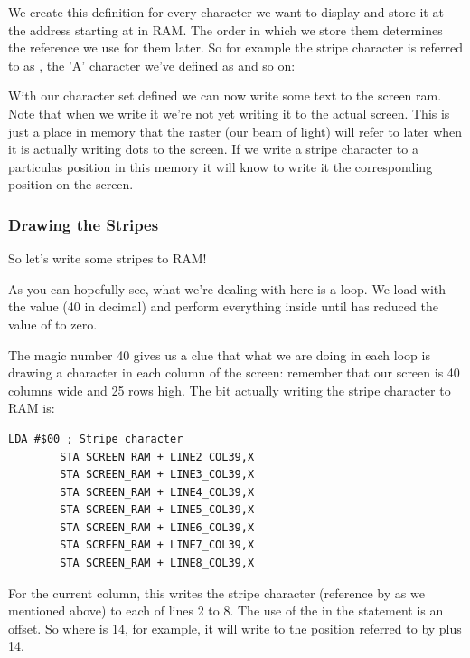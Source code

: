 We create this definition for every character we want to display and store it at the address starting at 
in RAM. The order in which we store them determines the reference we use for them later. So for example the stripe
character is referred to as , the 'A' character we've defined as  and so on:



With our character set defined we can now write some text to the screen ram. Note that when we write it 
we're not yet writing it to the actual screen. This is just a place in memory that the raster (our beam of light)
will refer to later when it is actually writing dots to the screen. If we write a stripe character to a particulas position
in this  memory it will know to write it the corresponding position on the screen.

\subsubsection{Drawing the Stripes}
So let's write some stripes to RAM!

%


As you can hopefully see, what we're dealing with here is a loop. We load  with the value  (40 in decimal)
and perform everything inside  until  has reduced the value of  to zero.

The magic number 40 gives us a clue that what we are doing in each loop is drawing a character in each column of the screen:
remember that our screen is 40 columns wide and 25 rows high. The bit actually writing the stripe character to RAM is:

\begin{lstlisting}[caption=In \icode{DrawStripesBehindTitle}]
        LDA #$00 ; Stripe character
        STA SCREEN_RAM + LINE2_COL39,X
        STA SCREEN_RAM + LINE3_COL39,X
        STA SCREEN_RAM + LINE4_COL39,X
        STA SCREEN_RAM + LINE5_COL39,X
        STA SCREEN_RAM + LINE6_COL39,X
        STA SCREEN_RAM + LINE7_COL39,X
        STA SCREEN_RAM + LINE8_COL39,X
\end{lstlisting}

For the current column, this writes the stripe character (reference by  as we mentioned above) to each of lines
2 to 8. The use of the  in the  statement is an offset. So where  is 14, for example,
it will write to the position referred to by  plus 14.

